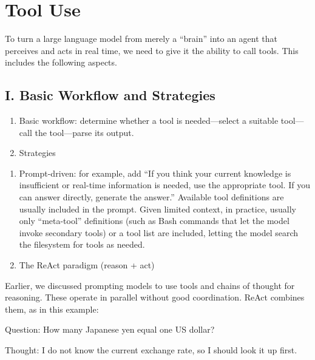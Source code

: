 \setcounter{section}{0}

\hypertarget{tool-use-1}{%
\section{Tool Use}\label{tool-use-1}}

To turn a large language model from merely a ``brain'' into an agent that perceives and acts in real time, we need to give it the ability to call tools. This includes the following aspects.

\hypertarget{i.-basic-workflow-and-strategies}{%
\subsection{I. Basic Workflow and Strategies}\label{i.-basic-workflow-and-strategies}}

\begin{enumerate}
\def\labelenumi{\arabic{enumi}.}
\item
  Basic workflow: determine whether a tool is needed---select a suitable tool---call the tool---parse its output.
\item
  Strategies
\end{enumerate}

\begin{enumerate}
\def\labelenumi{(\arabic{enumi})}
\item
  Prompt-driven: for example, add ``If you think your current knowledge is insufficient or real-time information is needed, use the appropriate tool. If you can answer directly, generate the answer.'' Available tool definitions are usually included in the prompt. Given limited context, in practice, usually only ``meta-tool'' definitions (such as Bash commands that let the model invoke secondary tools) or a tool list are included, letting the model search the filesystem for tools as needed.
\item
  The ReAct paradigm (reason + act)
\end{enumerate}

Earlier, we discussed prompting models to use tools and chains of thought for reasoning. These operate in parallel without good coordination. ReAct combines them, as in this example:

Question: How many Japanese yen equal one US dollar?

Thought: I do not know the current exchange rate, so I should look it up first.

